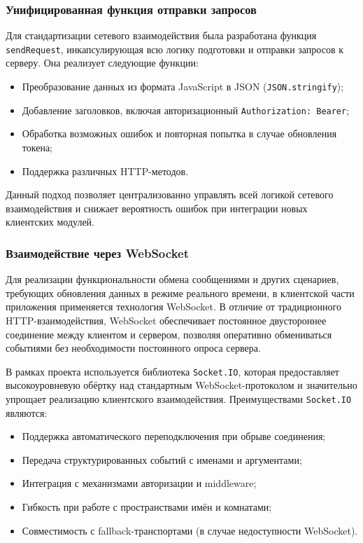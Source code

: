\subsubsection{Унифицированная функция отправки запросов}

Для стандартизации сетевого взаимодействия была разработана функция \texttt{sendRequest}, инкапсулирующая всю логику подготовки и отправки запросов к серверу. Она реализует следующие функции:
\begin{itemize}
  \item Преобразование данных из формата JavaScript в JSON (\texttt{JSON.stringify});
  \item Добавление заголовков, включая авторизационный \texttt{Authorization: Bearer};
  \item Обработка возможных ошибок и повторная попытка в случае обновления токена;
  \item Поддержка различных HTTP-методов.
\end{itemize}

Данный подход позволяет централизованно управлять всей логикой сетевого взаимодействия и снижает вероятность ошибок при интеграции новых клиентских модулей.

\subsubsection{Взаимодействие через WebSocket}

Для реализации функциональности обмена сообщениями и других сценариев, требующих обновления данных в режиме реального времени, в клиентской части приложения применяется технология WebSocket. В отличие от традиционного HTTP-взаимодействия, WebSocket обеспечивает постоянное двустороннее соединение между клиентом и сервером, позволяя оперативно обмениваться событиями без необходимости постоянного опроса сервера.

В рамках проекта используется библиотека \texttt{Socket.IO}, которая предоставляет высокоуровневую обёртку над стандартным WebSocket-протоколом и значительно упрощает реализацию клиентского взаимодействия. Преимуществами \texttt{Socket.IO} являются:
\begin{itemize}
  \item Поддержка автоматического переподключения при обрыве соединения;
  \item Передача структурированных событий с именами и аргументами;
  \item Интеграция с механизмами авторизации и middleware;
  \item Гибкость при работе с пространствами имён и комнатами;
  \item Совместимость с fallback-транспортами (в случае недоступности WebSocket).
\end{itemize}

